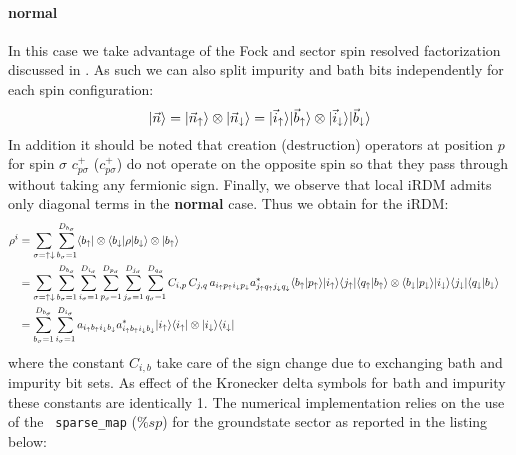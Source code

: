 \documentclass[edipack2.tex]{subfiles}
\begin{document}
\paragraph{{\bf normal}}
In this case we take advantage of the Fock and sector spin resolved
factorization discussed in . As such we can also split
impurity and bath bits independently for each spin configuration:
$$
|\vec{n}\rangle =
|\vec{n}_\uparrow\rangle\otimes |\vec{n}_\downarrow\rangle =
|\vec{i}_\uparrow\rangle|\vec{b}_\uparrow\rangle\otimes |\vec{i}_\downarrow\rangle|\vec{b}_\downarrow\rangle
$$
In addition it should be noted that creation (destruction) operators at
position $p$ for spin $\sigma$  $c^+_{p\sigma}$ ($c^+_{p\sigma}$) do
not operate on the opposite spin so that they pass through without
taking any fermionic sign. Finally, we observe that local iRDM admits
only diagonal terms in the {\bf normal} case. Thus we obtain for the iRDM:
\begin{equation}
  \label{iRDMnormal}
  \begin{aligned}
  \rho^i &=
  \sum_{\sigma=\uparrow\downarrow}\sum_{b_\sigma=1}^{D_{b_\sigma}}
  \langle b_\uparrow|\otimes\langle b_\downarrow|
    \rho
    |b_\downarrow\rangle\otimes|b_\uparrow\rangle    \cr
    &=\sum_{\sigma=\uparrow\downarrow}
    \sum_{b_\sigma=1}^{D_{b_\sigma}}
    \sum_{i_\sigma=1}^{D_{i_\sigma}}
    \sum_{p_\sigma=1}^{D_{p_\sigma}}
    \sum_{j_\sigma=1}^{D_{j_\sigma}} 
    \sum_{q_\sigma=1}^{D_{q_\sigma}}
    C_{i,p}\,C_{j,q}\,a_{i_\uparrow p_\uparrow i_\downarrow p_\downarrow} a^*_{j_\uparrow q_\uparrow j_\downarrow q_\downarrow}
    \langle b_\uparrow| p_\uparrow\rangle| i_\uparrow\rangle\langle j_\uparrow |\langle q_\uparrow| b_\uparrow\rangle   \otimes \langle b_\downarrow| p_\downarrow \rangle|i_\downarrow\rangle \langle j_\downarrow  |\langle q_\downarrow| b_\downarrow\rangle
    \cr
&=
    \sum_{b_\sigma=1}^{D_{b_\sigma}}
    \sum_{i_\sigma=1}^{D_{i_\sigma}}
    a_{i_\uparrow b_\uparrow i_\downarrow b_\downarrow} a^*_{i_\uparrow b_\uparrow i_\downarrow b_\downarrow}
    |i_\uparrow\rangle\langle i_\uparrow|\otimes |i_\downarrow\rangle\langle i_\downarrow|
  \end{aligned}
\end{equation}
where the constant $C_{i,b}$ take care of the sign change due to
exchanging bath and impurity bit sets. As effect of the Kronecker
delta symbols for bath and impurity these constants are identically 1.  
The numerical implementation relies on the use of the {\tt
  sparse\_map} ($\%sp$) for the groundstate sector as reported in the
listing below:  
\end{document}
